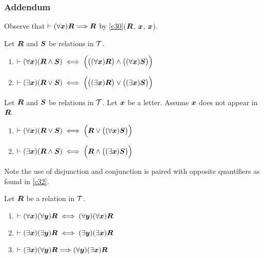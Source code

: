 \subsubsection{Addendum} Observe that $\vdash(\forall\boldsymbol{x})\boldsymbol{R}\Longrightarrow\boldsymbol{R}$
by \ref{c30}($\boldsymbol{R}$, $\boldsymbol{x}$, $\boldsymbol{x}$).

\begin{dc}\label{c32}
Let $\boldsymbol{R}$ and $\boldsymbol{S}$ be relations in $\mathcal{T}$.
\begin{enumerate}
\item $\vdash(\forall\boldsymbol{x})(\boldsymbol{R}\land\boldsymbol{S})\iff\Bigl(\bigl((\forall\boldsymbol{x})\boldsymbol{R}\bigr)\land\bigl((\forall\boldsymbol{x})\boldsymbol{S}\bigr)\Bigr)$
\item $\vdash(\exists\boldsymbol{x})(\boldsymbol{R}\lor\boldsymbol{S})\iff\Bigl(\bigl((\exists\boldsymbol{x})\boldsymbol{R}\bigr)\lor\bigl((\exists\boldsymbol{x})\boldsymbol{S}\bigr)\Bigr)$
\end{enumerate}
\end{dc}

\begin{dc}\label{c33}
Let $\boldsymbol{R}$ and $\boldsymbol{S}$ be relations in $\mathcal{T}$.
Let $\boldsymbol{x}$ be a letter. Assume $\boldsymbol{x}$ does not
appear in $\boldsymbol{R}$.
\begin{enumerate}
\item $\vdash(\forall\boldsymbol{x})(\boldsymbol{R}\lor\boldsymbol{S})\iff\Bigl(\boldsymbol{R}\lor\bigl((\forall\boldsymbol{x})\boldsymbol{S}\bigr)\Bigr)$
\item $\vdash(\exists\boldsymbol{x})(\boldsymbol{R}\land\boldsymbol{S})\iff\Bigl(\boldsymbol{R}\land\bigl((\exists\boldsymbol{x})\boldsymbol{S}\bigr)\Bigr)$
\end{enumerate}
Note the use of disjunction and conjunction is paired with opposite
quantifiers as found in \ref{c32}.
\end{dc}

\begin{dc}\label{c34}
Let $\boldsymbol{R}$ be a relation in $\mathcal{T}$.
\begin{enumerate}
\item $\vdash(\forall\boldsymbol{x})(\forall\boldsymbol{y})\boldsymbol{R}\iff(\forall\boldsymbol{y})(\forall\boldsymbol{x})\boldsymbol{R}$
\item $\vdash(\exists\boldsymbol{x})(\exists\boldsymbol{y})\boldsymbol{R}\iff(\exists\boldsymbol{y})(\exists\boldsymbol{x})\boldsymbol{R}$
\item $\vdash(\exists\boldsymbol{x})(\forall\boldsymbol{y})\boldsymbol{R}\Longrightarrow(\forall\boldsymbol{y})(\exists\boldsymbol{x})\boldsymbol{R}$
\end{enumerate}
\end{dc}
